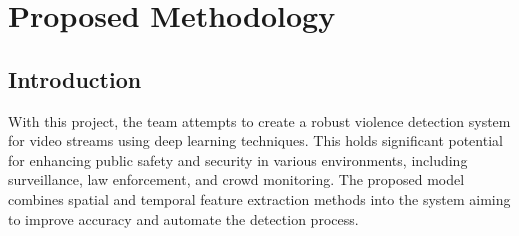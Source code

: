 \chapter{Proposed Methodology}
\setcounter{equation}{0}


\section{Introduction}

With this project, the team attempts to create a robust violence detection system for video streams using deep learning techniques. This holds significant potential for enhancing public safety and security in various environments, including surveillance, law enforcement, and crowd monitoring. The proposed model combines spatial and temporal feature extraction methods into the system aiming to improve accuracy and automate the detection process.







